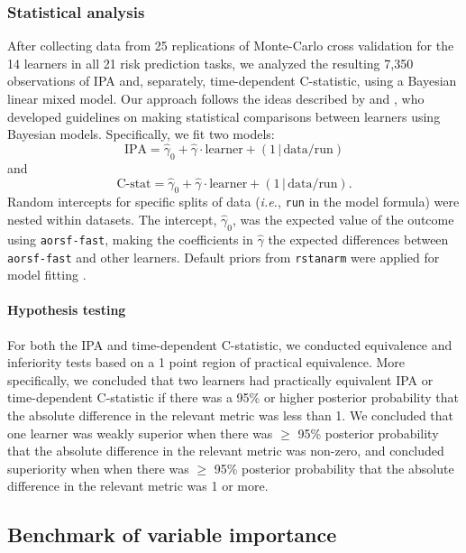 \documentclass[12pt]{article}\usepackage[]{graphicx}\usepackage[]{xcolor}
\newcommand{\ie}{\textit{i.e.}}
\begin{document}
\subsubsection{Statistical analysis}

After collecting data from 25 replications of Monte-Carlo cross validation for the 14 learners in all 21 risk prediction tasks, we analyzed the resulting 7,350 observations of IPA and, separately, time-dependent C-statistic, using a Bayesian linear mixed model. Our approach follows the ideas described by \citet{benavoli2017time} and \citet{tidymodels}, who developed guidelines on making statistical comparisons between learners using Bayesian models. Specifically, we fit two models: $$\text{IPA} = \widehat{\gamma}_0 + \widehat{\gamma} \cdot \text{learner} + (1\,|\, \text{data/run}) $$ and $$\text{C-stat} = \widehat{\gamma}_0 + \widehat{\gamma} \cdot \text{learner} + (1\,|\, \text{data/run}).$$ Random intercepts for specific splits of data (\ie, \texttt{run} in the model formula) were nested within datasets. The intercept, $\widehat{\gamma}_0$, was the expected value of the outcome using \texttt{aorsf-fast}, making the coefficients in $\widehat{\gamma}$ the expected differences between \texttt{aorsf-fast} and other learners. Default priors from \texttt{rstanarm} were applied for model fitting \citep{rstanarm}.

\paragraph{Hypothesis testing} For both the IPA and time-dependent C-statistic, we conducted equivalence and inferiority tests based on a 1 point region of practical equivalence. More specifically, we concluded that two learners had practically equivalent IPA or time-dependent C-statistic if there was a 95\% or higher posterior probability that the absolute difference in the relevant metric was less than 1. We concluded that one learner was weakly superior when there was $\geq$ 95\% posterior probability that the absolute difference in the relevant metric was non-zero, and concluded superiority when when there was $\geq$ 95\% posterior probability that the absolute difference in the relevant metric was 1 or more.




\subsection{Benchmark of variable importance} \label{sec:bm_vi}
\end{document}
